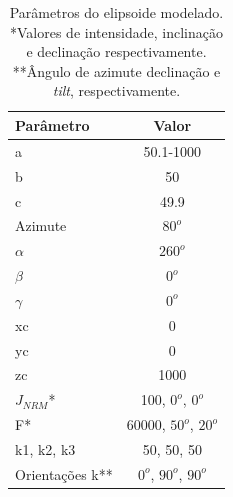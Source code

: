 \begin{table}[h]
	\begin{center}
		\begin{tabular}{|l|c|}
			\hline
			\textbf{Parâmetro}  & \textbf{Valor}  \\
			\hline 
			a   & 50.1-1000 \\
			\hline
			b   & 50  \\
			\hline
			c   & 49.9 \\
			\hline
			Azimute   & $80^o$ \\
			\hline
			$\alpha$    & $260^o$   \\
			\hline
			$\beta$    & $0^o$ \\
			\hline
			$\gamma$   & $0^o$  \\
			\hline
			xc   & 0  \\
			\hline          
			yc   & 0  \\
			\hline                
			zc   & 1000  \\
			\hline
			$J_{NRM}$*  & 100, $0^o$, $0^o$  \\
			\hline
			F*    & 60000, $50^o$, $20^o$ \\
			\hline
			k1, k2, k3   & 50, 50, 50  \\
			\hline
			Orientações k**   & $0^o$, $90^o$, $90^o$  \\
			\hline
		\end{tabular}
		\caption{Parâmetros do elipsoide modelado. *Valores de intensidade, inclinação e declinação respectivamente. **Ângulo de azimute
			declinação e \textit{tilt}, respectivamente.}
	\end{center}
	\label{tab:ellipsoid_shape_iso80}
\end{table}

